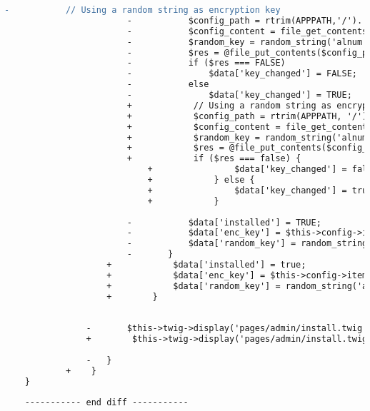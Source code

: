 \begin{lstlisting}[language=diff, caption=Perubahan pada kode Install.php]
						-			// Using a random string as encryption key
						-			$config_path = rtrim(APPPATH,'/').'/config/config.php';
						-			$config_content = file_get_contents($config_path);
						-			$random_key = random_string('alnum', 32);
						-			$res = @file_put_contents($config_path, str_replace($this->config->item('encryption_key'), $random_key, $config_content));
						-			if ($res === FALSE)
						-				$data['key_changed'] = FALSE;
						-			else
						-				$data['key_changed'] = TRUE;
						+            // Using a random string as encryption key
						+            $config_path = rtrim(APPPATH, '/').'/config/config.php';
						+            $config_content = file_get_contents($config_path);
						+            $random_key = random_string('alnum', 32);
						+            $res = @file_put_contents($config_path, str_replace($this->config->item('encryption_key'), $random_key, $config_content));
						+            if ($res === false) {
							+                $data['key_changed'] = false;
							+            } else {
							+                $data['key_changed'] = true;
							+            }
						
						-			$data['installed'] = TRUE;
						-			$data['enc_key'] = $this->config->item('encryption_key');
						-			$data['random_key'] = random_string('alnum', 32);
						-		}
					+            $data['installed'] = true;
					+            $data['enc_key'] = $this->config->item('encryption_key');
					+            $data['random_key'] = random_string('alnum', 32);
					+        }
				
				
				-		$this->twig->display('pages/admin/install.twig', $data);
				+        $this->twig->display('pages/admin/install.twig', $data);
				
				-	}
			+    }
	}
	
	----------- end diff -----------
\end{lstlisting}

